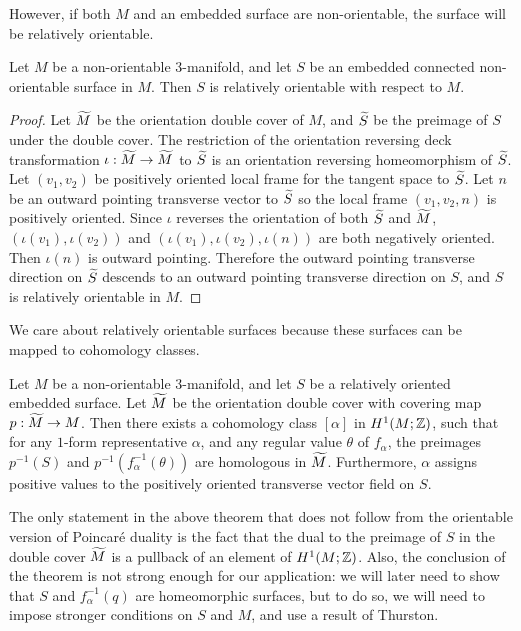 However, if both $M$ and an embedded surface are non-orientable, the surface will be relatively orientable.
\begin{prop}
  \label{prop:relative-orientability}
  Let $M$ be a non-orientable $3$-manifold, and let $S$ be an embedded connected non-orientable surface in $M$.
  Then $S$ is relatively orientable with respect to $M$.
\end{prop}
\begin{proof}
  Let $\widetilde{M}$ be the orientation double cover of $M$, and $\widetilde{S}$ be the preimage of $S$ under the double cover.
  The restriction of the orientation reversing deck transformation $\iota:\widetilde{M}\rightarrow\widetilde{M}$ to $\widetilde{S}$ is an orientation reversing homeomorphism of $\widetilde{S}$.
  Let $(v_1, v_2)$ be positively oriented local frame for the tangent space to $\widetilde{S}$.
  Let $n$ be an outward pointing transverse vector to $\widetilde{S}$ so the local frame $(v_1, v_2, n)$ is positively oriented.
  Since $\iota$ reverses the orientation of both $\widetilde{S}$ and $\widetilde{M}$, $(\iota(v_1), \iota(v_2))$ and $(\iota(v_1), \iota(v_2), \iota(n))$ are both negatively oriented.
  Then $\iota(n)$ is outward pointing.
  Therefore the outward pointing transverse direction on $\widetilde{S}$ descends to an outward pointing transverse direction on $S$, and $S$ is relatively orientable in $M$.
\end{proof}

We care about relatively orientable surfaces because these surfaces can be mapped to cohomology classes.
\begin{thm}
  \label{thm:Poincare-duality}
  Let $M$ be a non-orientable $3$-manifold, and let $S$ be a relatively oriented embedded surface.  Let $\widetilde{M}$ be the orientation double cover with covering map $p:\widetilde{M}\to M$.
  Then there exists a cohomology class $[\alpha]$ in $H^1(M; \mathbb{Z})$, such that for any $1$-form representative $\alpha$, and any regular value $\theta$ of $f_{\alpha}$, the preimages $p^{-1}(S)$ and $p^{-1}(f_{\alpha}^{-1}(\theta))$ are homologous in $\widetilde{M}$.
  Furthermore, $\alpha$ assigns positive values to the positively oriented transverse vector field on $S$.
\end{thm}
\begin{rem}
  The only statement in the above theorem that does not follow from the orientable version of Poincar\'e duality is the fact that the dual to the preimage of $S$ in the double cover $\widetilde{M}$ is a pullback of an element of $H^1(M; \mathbb{Z})$. Also, the conclusion of the theorem is not strong enough for our application: we will later need to show that $S$ and $f_{\alpha}^{-1}(q)$ are homeomorphic surfaces, but to do so, we will need to impose stronger conditions on $S$ and $M$, and use a result of Thurston.
\end{rem}

